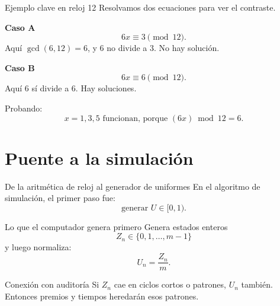 \documentclass[aspectratio=1610, 9pt]{beamer}
\begin{document}
\begin{frame}{Ejemplo clave en reloj 12}
    Resolvamos dos ecuaciones para ver el contraste.

    \vspace{0.3cm}
    \textbf{Caso A}
    \[
    6x \equiv 3 \pmod{12}.
    \]
    Aquí $\gcd(6,12)=6$, y 6 no divide a 3. No hay solución.

    \vspace{0.35cm}
    \textbf{Caso B}
    \[
    6x \equiv 6 \pmod{12}.
    \]
    Aquí 6 sí divide a 6. Hay soluciones.

    \vspace{0.25cm}
    Probando:
    \[
    x=1,3,5 \text{ funcionan, porque } (6x)\bmod 12 = 6.
    \]
\end{frame}

\section{Puente a la simulación}

\begin{frame}{De la aritmética de reloj al generador de uniformes}
    En el algoritmo de simulación, el primer paso fue:
    \[
    \text{generar } U\in[0,1).
    \]

    \vspace{0.25cm}
    \begin{block}{Lo que el computador genera primero}
    Genera estados enteros
    \[
    Z_n\in\{0,1,\dots,m-1\}
    \]
    y luego normaliza:
    \[
    U_n=\frac{Z_n}{m}.
    \]
    \end{block}

    \vspace{0.2cm}
    \begin{alertblock}{Conexión con auditoría}
    Si $Z_n$ cae en ciclos cortos o patrones, $U_n$ también.
    Entonces premios y tiempos heredarán esos patrones.
    \end{alertblock}
\end{frame}
\end{document}
